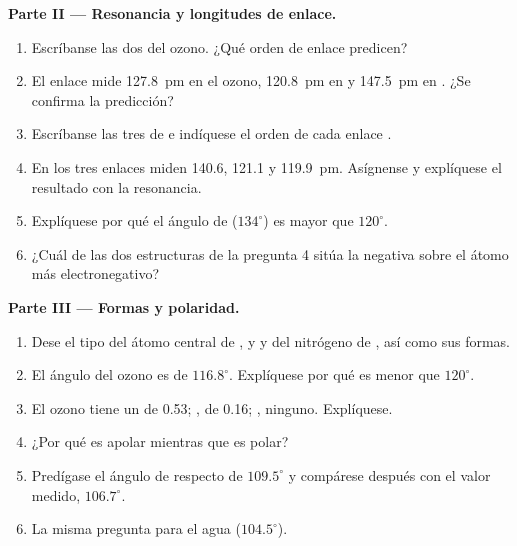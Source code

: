 \begin{problem}
\medskip
\noindent\textbf{Parte II --- Resonancia y longitudes de enlace.}
\begin{enumerate}[resume]
  \item Escríbanse las dos  del ozono. ¿Qué orden de
        enlace predicen?
  \item El enlace  mide \qty{127.8}{pm} en el ozono,
        \qty{120.8}{pm} en  y \qty{147.5}{pm} en . ¿Se
        confirma la predicción?
  \item Escríbanse las tres  de  e indíquese el
        orden de cada enlace .
  \item En  los tres enlaces  miden 140.6, 121.1 y
        \qty{119.9}{pm}. Asígnense y explíquese el resultado con la
        resonancia.
  \item Explíquese por qué el ángulo  de  ($134^\circ$)
        es mayor que $120^\circ$.
  \item ¿Cuál de las dos estructuras de la pregunta 4 sitúa la  negativa sobre el átomo más electronegativo?
\end{enumerate}

\medskip
\noindent\textbf{Parte III --- Formas y polaridad.}
\begin{enumerate}[resume]
  \item Dese el tipo  del átomo central de ,
         y  y del nitrógeno de , así como sus
        formas.
  \item El ángulo del ozono es de $116.8^\circ$. Explíquese por qué es
        menor que $120^\circ$.
  \item El ozono tiene un  de \qty{0.53}{\debye}; ,
        de \qty{0.16}{\debye}; , ninguno. Explíquese.
  \item ¿Por qué  es apolar mientras que  es polar?
  \item Predígase el ángulo de  respecto de $109.5^\circ$ y
        compárese después con el valor medido, $106.7^\circ$.
  \item La misma pregunta para el agua ($104.5^\circ$).
\end{enumerate}


\end{problem}
